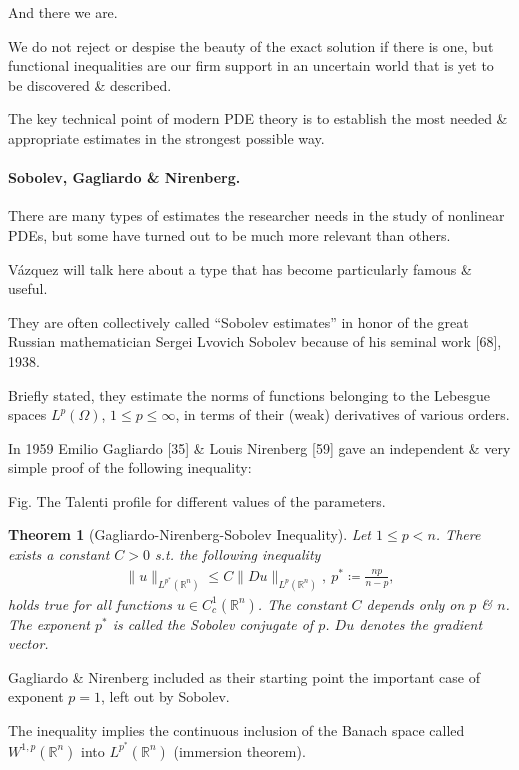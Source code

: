 \documentclass{article}
\newtheorem{theorem}{Theorem}
\begin{document}
%
And there we are.

We do not reject or despise the beauty of the exact solution if there is one, but functional inequalities are our firm support in an uncertain world that is yet to be discovered \& described.

The key technical point of modern PDE theory is to establish the most needed \& appropriate estimates in the strongest possible way.

\paragraph{Sobolev, Gagliardo \& Nirenberg.} There are many types of estimates the researcher needs in the study of nonlinear PDEs, but some have turned out to be much more relevant than others.

V\'azquez will talk here about a type that has become particularly famous \& useful.

They are often collectively called ``Sobolev estimates'' in honor of the great Russian mathematician Sergei Lvovich Sobolev because of his seminal work [68], 1938.

Briefly stated, they estimate the norms of functions belonging to the Lebesgue spaces $L^p(\Omega)$, $1\le p\le\infty$, in terms of their (weak) derivatives of various orders.

In 1959 Emilio Gagliardo [35] \& Louis Nirenberg [59] gave an independent \& very simple proof of the following inequality:

\textsf{Fig. The Talenti profile for different values of the parameters.}

\begin{theorem}[Gagliardo-Nirenberg-Sobolev Inequality]
	Let $1\le p < n$. There exists a constant $C > 0$ s.t. the following inequality
	\begin{align*}
		\|u\|_{L^{p^*}(\mathbb{R}^n)}\le C\|Du\|_{L^p(\mathbb{R}^n)},\ p^*\coloneqq\frac{np}{n - p},
	\end{align*}
	holds true for all functions $u\in C_c^1(\mathbb{R}^n)$. The constant $C$ depends only on $p$ \& $n$. The exponent $p^*$ is called the \emph{Sobolev conjugate} of $p$. $Du$ denotes the gradient vector.
\end{theorem}
Gagliardo \& Nirenberg included as their starting point the important case of exponent $p = 1$, left out by Sobolev.

The inequality implies the continuous inclusion of the Banach space called $W^{1,p}(\mathbb{R}^n)$ into $L^{p^*}(\mathbb{R}^n)$ (immersion theorem).
\end{document}
